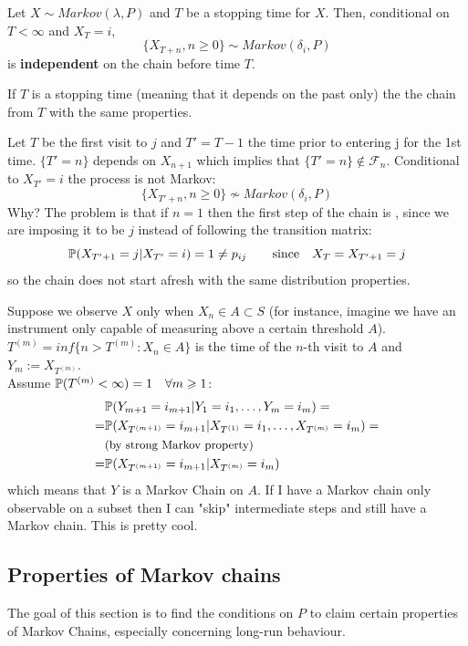 \documentclass{article}
\begin{document}
\begin{theorem}{}
    Let $X\sim Markov(\lambda,P)$ and $T$ be a stopping time for $X$. Then, conditional on $T<\infty$ and $X_T=i$, 
    \[
    \{X_{T+n},n\geqslant 0\}\sim Markov(\delta_i,P)
    \]
    is \textbf{independent} on the chain before time $T$.
\end{theorem}
If $T$ is a stopping time (meaning that it depends on the past only) the the chain  from $T$ with the same properties.
\begin{example}
    Let $T$ be the first visit to $j$ and $T'=T-1$ the time prior to entering j for the 1st time. $\{T'=n\}$ depends on $X_{n+1}$ which implies that $\{T'=n\}\notin\mathscr{F}_n$. Conditional to $X_{T'}=i$ the process is not Markov:
    \[
    \{X_{T'+n},n\geqslant 0\}\not\sim Markov(\delta_i,P)
    \]
    Why? The problem is that if $n=1$ then the first step of the chain is , since we are imposing it to be $j$ instead of following the transition matrix:
    \[
    \mathbb{P}(X_{T'+1}=j|X_{T'}=i)=1\neq p_{ij} \qquad\text{since}\quad X_T=X_{T'+1}=j
    \]
    so the chain does not start afresh with the same distribution properties.
\end{example}
\begin{example}
    Suppose we observe $X$ only when $X_n\in A\subset S$ (for instance, imagine we have an instrument only capable of measuring above a certain threshold $A$). $T^{(m)}=inf\{n> T^{(m)}:X_n \in A\}$ is the time of the $n$-th visit to $A$ and $Y_m:=X_{T^{(m)}}$.\\
    Assume $\mathbb{P}(T^{(m)}<\infty)=1 \quad \forall m \geqslant 1$:
    \begin{align*}
        &\mathbb{P}(Y_{m+1}=i_{m+1}|Y_1=i_1,\ldots,Y_m=i_m)=\\
        =&\mathbb{P}(X_{T^{(m+1)}}=i_{m+1}|X_{T^{(1)}}=i_1,\ldots,X_{T^{(m)}}=i_m)=\\
        &\text{\small(by strong Markov property)}\\
        =&\mathbb{P}(X_{T^{(m+1)}}=i_{m+1}|X_{T^{(m)}}=i_m)
    \end{align*}
    which means that $Y$ is a Markov Chain on $A$. If I have a Markov chain only observable on a subset then I can "skip" intermediate steps and still have a Markov chain. This is pretty cool.
\end{example}
\subsection{Properties of Markov chains}
The goal of this section is to find the conditions on $P$ to claim certain properties of Markov Chains, especially concerning long-run behaviour.
\end{document}
